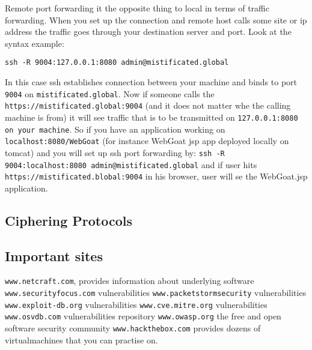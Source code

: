 \documentclass{article}[12pt]
\newcommand{\q}[1]{\texttt{#1}}
\begin{document}
Remote port forwarding it the opposite thing to local in terms of traffic forwarding.
When you set up the connection and remote host calls some site or ip address the traffic goes through your destination server and port.
Look at the syntax example: \newline\newline


\q{ssh -R 9004:127.0.0.1:8080 admin@mistificated.global}\newline\newline

In this case ssh establishes connection between your machine and binds to port \q{9004} on \q{mistificated.global}.
Now if someone calls the \q{https://mistificated.global:9004} (and it does not matter whe the calling machine is from) it will see traffic that is to be transmitted on \q{127.0.0.1:8080 on your machine}.
So if you have an application working on \q{localhost:8080/WebGoat} (for instance WebGoat jsp app deployed locally on tomcat) and you will set up ssh port forwarding by: \newline
\q{ssh -R 9004:localhost:8080 admin@mistificated.global} \newline
and if user hits \q{https://mistificated.blobal:9004} in his browser, user will se the WebGoat.jsp application.

\subsection{Ciphering Protocols}

\subsection{Important sites}
\texttt{www.netcraft.com}, provides information about underlying software
\texttt{www.securityfocus.com} vulnerabilities
\texttt{www.packetstormsecurity} vulnerabilities
\texttt{www.exploit-db.org} vulnerabilities
\texttt{www.cve.mitre.org} vulnerabilities
\texttt{www.osvdb.com} vulnerabilities repository
\texttt{www.owasp.org} the free and open software security community
\texttt{www.hackthebox.com} provides dozens of virtualmachines that you can practise on.
\texttt{}
\texttt{}
\texttt{}
\end{document}
